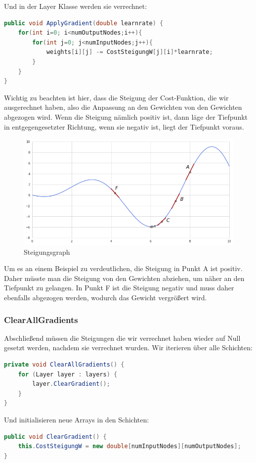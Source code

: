 \documentclass[12pt]{article}
\begin{document}
Und in der Layer Klasse werden sie verrechnet:\begin{lstlisting}[language=Java]
public void ApplyGradient(double learnrate) {
    for(int i=0; i<numOutputNodes;i++){
        for(int j=0; j<numInputNodes;j++){
            weights[i][j] -= CostSteigungW[j][i]*learnrate;
        }
    }
}
\end{lstlisting}
Wichtig zu beachten ist hier, dass die Steigung der Cost-Funktion, die wir ausgerechnet haben, also die Anpassung an den Gewichten von den Gewichten abgezogen wird. Wenn die Steigung nämlich positiv ist, dann läge der Tiefpunkt in entgegengesetzter Richtung, wenn sie negativ ist, liegt der Tiefpunkt voraus.\begin{figure}[H]
\centering
\includegraphics[scale=0.55]{./Images/Pasted image 20230917195146.png}
\caption{Steigungsgraph}
\label{Steigungsgraph}
\end{figure}
Um es an einem Beispiel zu verdeutlichen, die Steigung in Punkt A ist positiv. Daher müsste man die Steigung von den Gewichten abziehen, um näher an den Tiefpunkt zu gelangen. In Punkt F ist die Steigung negativ und muss daher ebenfalls abgezogen werden, wodurch das Gewicht vergrößert wird.\subsubsection{ClearAllGradients}Abschließend müssen die Steigungen die wir verrechnet haben wieder auf Null gesetzt werden, nachdem sie verrechnet wurden.
Wir iterieren über alle Schichten:\begin{lstlisting}[language=Java]
private void ClearAllGradients() {
    for (Layer layer : layers) {
        layer.ClearGradient();
    }
}
\end{lstlisting}
Und initialisieren neue Arrays in den Schichten:
\begin{lstlisting}[language=Java]
public void ClearGradient() {
    this.CostSteigungW = new double[numInputNodes][numOutputNodes];
}
\end{lstlisting}
\end{document}
